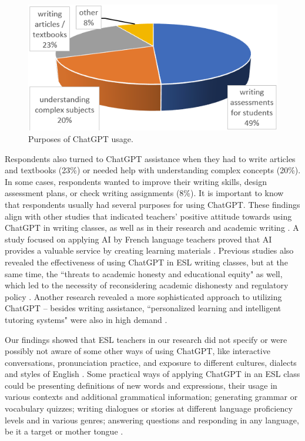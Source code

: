 \documentclass[english]{textolivre}
\begin{document}
\begin{figure}[h!]
    \centering
    \begin{minipage}{0.70\linewidth}
    \includegraphics[width=\linewidth]{Imagens/Figure5.png}
    \caption{Purposes of ChatGPT usage.}
    \label{fig-5}
    \end{minipage}
\end{figure}

Respondents also turned to ChatGPT assistance when they had to write articles and textbooks (23\%) or needed help with understanding complex concepts (20\%). In some cases, respondents wanted to improve their writing skills, design assessment plans, or check writing assignments (8\%). It is important to know that respondents usually had several purposes for using ChatGPT. These findings align with other studies that indicated teachers’ positive attitude towards using ChatGPT in writing classes, as well as in their research and academic writing \cites[p. 106]{iqbal2023}[p. 39]{nguyen2023}. A study focused on applying AI by French language teachers proved that AI provides a valuable service by creating learning materials \cite[p. 7591]{mavropoulou2023}. Previous studies also revealed the effectiveness of using ChatGPT in ESL writing classes, but at the same time, the ``threats to academic honesty and educational equity" as well, which led to the necessity of reconsidering academic dishonesty and regulatory policy \cite{yan2023}. Another research revealed a more sophisticated approach to utilizing ChatGPT – besides writing assistance, ``personalized learning and intelligent tutoring systems" were also in high demand \cite[p. 112]{huang2023}.

Our findings showed that ESL teachers in our research did not specify or were possibly not aware of some other ways of using ChatGPT, like interactive conversations, pronunciation practice, and exposure to different cultures, dialects and styles of English \cite[p. 3]{kostka2023}. Some practical ways of applying ChatGPT in an ESL class could be presenting definitions of new words and expressions, their usage in various contexts and additional grammatical information; generating grammar or vocabulary quizzes; writing dialogues or stories at different language proficiency levels and in various genres; answering questions and responding in any language, be it a target or mother tongue \cite[p. 539-544]{kohnke2023}.
\end{document}
